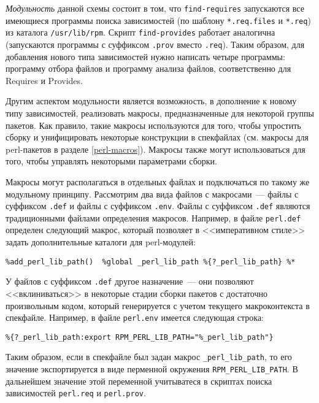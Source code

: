 \documentclass[russian,a4paper,12pt,titlepage]{article}
\begin{document}
\textit{Модульность} данной схемы состоит в том, что \verb|find-requires| запускаются все имеющиеся программы поиска зависимостей
(по шаблону \verb|*.req.files| и \verb|*.req|) из каталога \verb|/usr/lib/rpm|.  Скрипт \verb|find-provides| работает аналогична
(запускаются программы с суффиксом \verb|.prov| вместо \verb|.req|).  Таким образом, для добавления нового типа зависимостей
нужно написать четыре программы: программу отбора файлов и программу анализа файлов, соответственно для Requires и Provides.

Другим аспектом модульности является возможность, в дополнение к новому типу зависимостей, реализовать макросы,
предназначенные для некоторой группы пакетов.  Как правило, такие макросы используются для того, чтобы упростить
сборку и унифицировать некоторые конструкции в спекфайлах (см. макросы для perl-пакетов в разделе \ref{perl-macros}).
Макросы также могут использоваться для того, чтобы управлять некоторыми параметрами сборки.

Макросы могут располагаться в отдельных файлах и подключаться по такому же модульному принципу.
Рассмотрим два вида файлов с макросами~--- файлы с суффиксом \verb|.def| и файлы с суффиксом \verb|.env|.
Файлы с суффиксом \verb|.def|\label{def-macro-files} являются традиционными файлами определения макросов.  Например,
в файле \verb|perl.def| определен следующий макрос, который позволяет в <<императивном стиле>> задать дополнительные
каталоги для perl-модулей:
\begin{verbatim}
%add_perl_lib_path()  %global _perl_lib_path %{?_perl_lib_path} %*
\end{verbatim}

У файлов с суффиксом \verb|.def| другое назначение~--- они позволяют <<вклиниваться>> в некоторые стадии сборки пакетов
с достаточно произвольным кодом, который генерируется с учетом текущего макроконтекста в спекфайле.
Например, в файле \verb|perl.env| имеется следующая строка:
\begin{verbatim}
%{?_perl_lib_path:export RPM_PERL_LIB_PATH="%_perl_lib_path"}
\end{verbatim}
Таким образом, если в спекфайле был задан макрос \verb|_perl_lib_path|, то его значение экспортируется
в виде перменной окружения \verb|RPM_PERL_LIB_PATH|.  В дальнейшем значение этой переменной учитыватеся
в скриптах поиска зависимостей \verb|perl.req| и \verb|perl.prov|.
\end{document}
